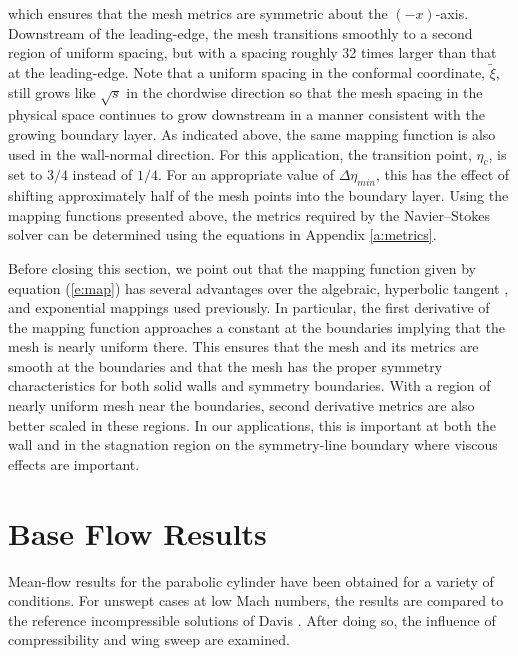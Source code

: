 which ensures that the mesh metrics are symmetric about the $(-x)$-axis.
Downstream of the leading-edge, the mesh transitions smoothly to a second
region of uniform spacing, but with a spacing roughly 32 times larger than
that at the leading-edge.  Note that a uniform spacing in the conformal
coordinate, $\tilde\xi$, still grows like $\sqrt{s}$ in the chordwise
direction so that the mesh spacing in the physical space continues to grow
downstream in a manner consistent with the growing boundary layer.  As
indicated above, the same mapping function is also used in the wall-normal
direction.  For this application, the transition point, $\eta_c$, is set to
$3/4$ instead of $1/4$.  For an appropriate value of $\Delta\eta_{min}$, this
has the effect of shifting approximately half of the mesh points into the
boundary layer.  Using the mapping functions presented above, the metrics
required by the Navier--Stokes solver can be determined using the equations in
Appendix \ref{a:metrics}.

Before closing this section, we point out that the mapping function given by
equation (\ref{e:map}) has several advantages over the algebraic, hyperbolic
tangent \cite{Lin:92}, and exponential \cite{FeStHa:92,Fenno:93} mappings used
previously.  In particular, the first derivative of the mapping function
approaches a constant at the boundaries implying that the mesh is nearly
uniform there.  This ensures that the mesh and its metrics are smooth at the
boundaries and that the mesh has the proper symmetry characteristics for both
solid walls and symmetry boundaries.  With a region of nearly uniform mesh
near the boundaries, second derivative metrics are also better scaled in these
regions.  In our applications, this is important at both the wall and in the
stagnation region on the symmetry-line boundary where viscous effects are
important.
%
%

\section{Base Flow Results \label{s:pcylmean}}

Mean-flow results for the parabolic cylinder have been obtained for a variety
of conditions.  For unswept cases at low Mach numbers, the results are
compared to the reference incompressible solutions of Davis \cite{Davis:72}.
After doing so, the influence of compressibility and wing sweep are examined.
%
%
%

